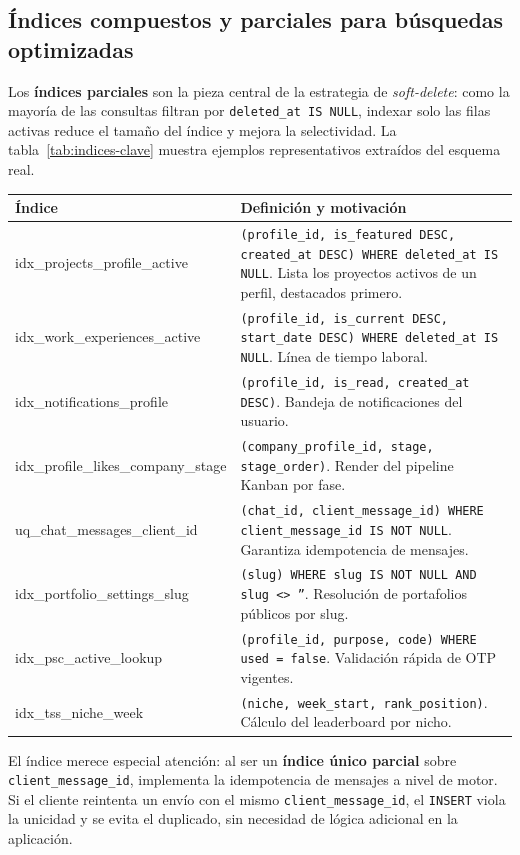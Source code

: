 \subsection{Índices compuestos y parciales para búsquedas optimizadas}
\label{subsec:compuestos}

Los \textbf{índices parciales} son la pieza central de la estrategia de
\textit{soft-delete}: como la mayoría de las consultas filtran por
\texttt{deleted\_at IS NULL}, indexar solo las filas activas reduce el tamaño del índice
y mejora la selectividad. La tabla~\ref{tab:indices-clave} muestra ejemplos
representativos extraídos del esquema real.

\vspace{0.2cm}
\noindent
\renewcommand{\arraystretch}{1.25}
\fontsize{8}{9.6}\selectfont\sffamily
\begin{tabularx}{\textwidth}{|>{\ttfamily\color{colorPrimario}\scriptsize}l|X|}
\hline
\rowcolor{headerTabla}
\sffamily\textbf{Índice} & \sffamily\textbf{Definición y motivación} \\
\hline
idx\_projects\_profile\_active & \texttt{(profile\_id, is\_featured DESC, created\_at DESC) WHERE deleted\_at IS NULL}. Lista los proyectos activos de un perfil, destacados primero. \\
\hline
\rowcolor{grisTecnico}
idx\_work\_experiences\_active & \texttt{(profile\_id, is\_current DESC, start\_date DESC) WHERE deleted\_at IS NULL}. Línea de tiempo laboral. \\
\hline
idx\_notifications\_profile & \texttt{(profile\_id, is\_read, created\_at DESC)}. Bandeja de notificaciones del usuario. \\
\hline
\rowcolor{grisTecnico}
idx\_profile\_likes\_company\_stage & \texttt{(company\_profile\_id, stage, stage\_order)}. Render del pipeline Kanban por fase. \\
\hline
uq\_chat\_messages\_client\_id & \texttt{(chat\_id, client\_message\_id) WHERE client\_message\_id IS NOT NULL}. Garantiza idempotencia de mensajes. \\
\hline
\rowcolor{grisTecnico}
idx\_portfolio\_settings\_slug & \texttt{(slug) WHERE slug IS NOT NULL AND slug <> ''}. Resolución de portafolios públicos por slug. \\
\hline
idx\_psc\_active\_lookup & \texttt{(profile\_id, purpose, code) WHERE used = false}. Validación rápida de OTP vigentes. \\
\hline
\rowcolor{grisTecnico}
idx\_tss\_niche\_week & \texttt{(niche, week\_start, rank\_position)}. Cálculo del leaderboard por nicho. \\
\hline
\end{tabularx}
\label{tab:indices-clave}

\begin{NotaTecnica}
El índice  merece especial atención: al ser un
\textbf{índice único parcial} sobre \texttt{client\_message\_id}, implementa la
idempotencia de mensajes a nivel de motor. Si el cliente reintenta un envío con el mismo
\texttt{client\_message\_id}, el \texttt{INSERT} viola la unicidad y se evita el
duplicado, sin necesidad de lógica adicional en la aplicación.
\end{NotaTecnica}
